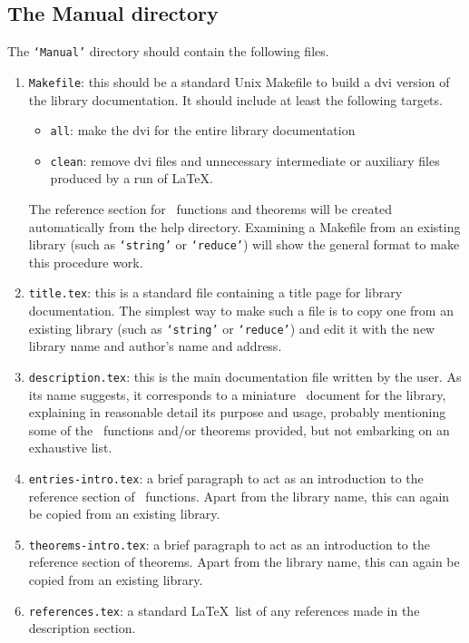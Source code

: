 \documentclass[12pt]{article}
\def\latex{{\LaTeX}}
\begin{document}
\subsection{The Manual directory}

The {\tt `Manual'} directory should contain the following files.

\begin{enumerate}

\item{\tt Makefile}: this should be a standard Unix Makefile to build a dvi
version of the library documentation. It should include at least the following
targets.

\begin{itemize}
\item{\tt all}: make the dvi for the entire library documentation
\item{\tt clean}: remove dvi files and unnecessary intermediate or auxiliary
files produced by a run of \latex.
\end{itemize}

The reference section for \ML\ functions and theorems will be created
automatically from the help directory. Examining a Makefile from an existing
library (such as {\tt `string'} or {\tt `reduce'}) will show the general format
to make this procedure work.

\item{\tt title.tex}: this is a standard file containing a title page for
library documentation. The simplest way to make such a file is to copy one from
an existing library (such as {\tt `string'} or {\tt `reduce'}) and edit it with
the new library name and author's name and address.

\item{\tt description.tex}: this is the main documentation file written by the
user. As its name suggests, it corresponds to a miniature \DESCRIPTION\
document for the library, explaining in reasonable detail its purpose and
usage, probably mentioning some of the \ML\ functions and/or theorems provided,
but not embarking on an exhaustive list.

\item{\tt entries-intro.tex}: a brief paragraph to act as an introduction to
the reference section of \ML\ functions. Apart from the library name, this can
again be copied from an existing library.

\item{\tt theorems-intro.tex}: a brief paragraph to act as an introduction to
the reference section of theorems. Apart from the library name, this can again
be copied from an existing library.

\item{\tt references.tex}: a standard \latex\ list of any references made in the
description section.

\end{enumerate}
\end{document}
